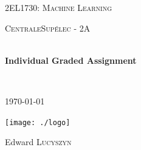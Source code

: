 \begin{titlepage}
\begin{center}


\LARGE \textsc{2EL1730: Machine Learning}

\vspace{0.2cm}

\Large \textsc{CentraleSupélec - 2A}

\vspace{0.3cm}

\HRule \\[0.4cm]

{\huge \bfseries Individual Graded Assignment\\
[0.2cm]}

\HRule \\[0.4cm]

\vspace{2cm}

\textsc{\today}

\vspace{2cm}

\texttt{[image: ./logo]}~\\[3cm]

\begin{minipage}{0.4\textwidth}
\begin{spacing}{1.125}
\begin{center}
    Edward \textsc{Lucyszyn}
\end{center}
\end{spacing}
\end{minipage}

\vfill

\end{center}
\end{titlepage}